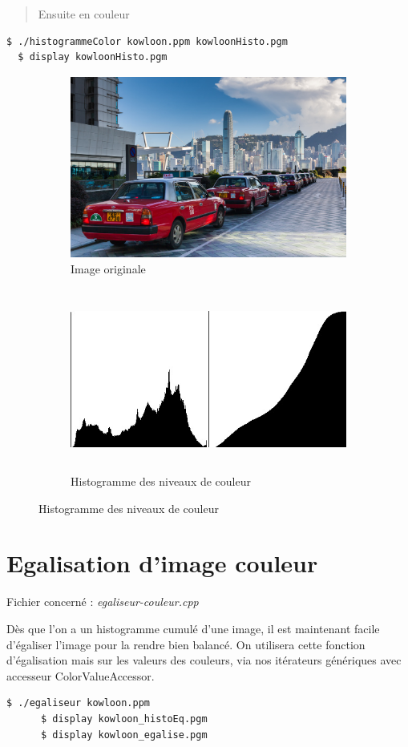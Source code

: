 \documentclass[a4paper,10pt]{article}
\begin{document}
    \begin{quote}
    Ensuite en couleur
    \end{quote}
    \begin{lstlisting}[language=Bash]
  $ ./histogrammeColor kowloon.ppm kowloonHisto.pgm     
  $ display kowloonHisto.pgm
  \end{lstlisting}
  \begin{figure}[h]
   \begin{subfigure}{1\textwidth}
    \centering
    \includegraphics[width=0.8\linewidth, height=6cm]{kowloon}
    \caption{Image originale}
    \label{fig:kowloonO}
    \end{subfigure}
     \begin{subfigure}{1\textwidth}
    \centering
    \includegraphics[width=1\linewidth, height=6cm]{kowloonHisto}   
    \caption{Histogramme des niveaux de couleur}
    \label{fig:kowloonHisto}
    \end{subfigure}
    \end{figure}

    \pagebreak
    \section{Egalisation d'image couleur}
    Fichier concerné : \emph{egaliseur-couleur.cpp}

    Dès que l'on a un histogramme cumulé d'une image, il est maintenant facile d'égaliser l'image pour la rendre bien balancé. On utilisera cette fonction d'égalisation mais sur les valeurs des couleurs, via nos itérateurs génériques avec accesseur ColorValueAccessor. 
    \begin{lstlisting}[language=Bash]
      $ ./egaliseur kowloon.ppm    
      $ display kowloon_histoEq.pgm
      $ display kowloon_egalise.pgm
    \end{lstlisting}
\end{document}
